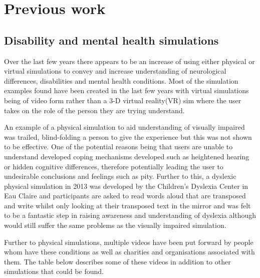 \section{Previous work}

\subsection{Disability and mental health simulations}
Over the last few years there appears to be an increase of using either physical or virtual simulations to convey and increase understanding of neurological differences, disabilities and mental health conditions. Most of the simulation examples found have been created in the last few years with virtual simulations being of video form rather than a 3-D virtual reality(VR) sim where the user takes on the role of the person they are trying understand.  

An example of a physical simulation to aid understanding of visually impaired was trailed, blind-folding a person to give the experience but this was not shown to be effective\cite{dd}. One of the potential reasons being that users are unable to understand developed coping mechanisms developed such as heightened hearing or hidden cognitive differences, therefore potentially leading the user to undesirable conclusions and feelings such as pity. Further to this, a dyslexic physical simulation in 2013 was developed by the Children’s Dyslexia Center in Eau Claire and participants are asked to read words aloud that are transposed and write whilst only looking at their transposed text in the mirror\cite{udyslexia} and was felt to be a fantastic step in raising awareness and understanding of dyslexia although would still suffer the same problems as the visually impaired simulation. 

Further to physical simulations, multiple videos have been put forward by people whom have these conditions as well as charities and organisations associated with them. The table below describes some of these videos in addition to other simulations that could be found. 

